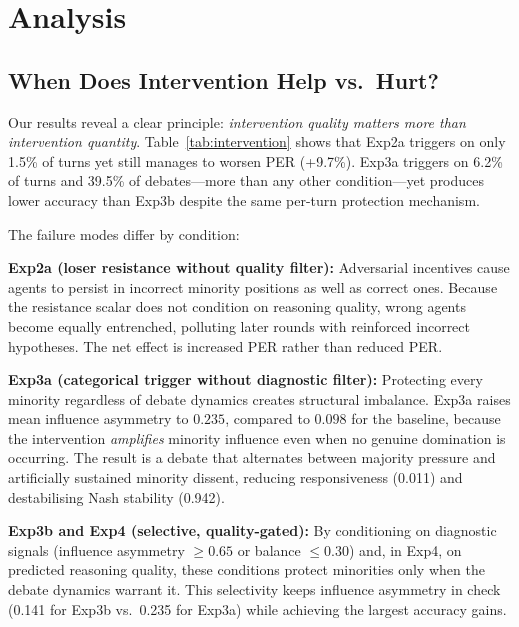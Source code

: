 \section{Analysis}
\label{sec:analysis}

\subsection{When Does Intervention Help vs.\ Hurt?}
\label{sec:when}

Our results reveal a clear principle: \emph{intervention quality matters
more than intervention quantity}.
Table~\ref{tab:intervention} shows that Exp2a triggers on only 1.5\% of
turns yet still manages to worsen PER (+9.7\%).
Exp3a triggers on 6.2\% of turns and 39.5\% of debates—more than any
other condition—yet produces lower accuracy than Exp3b despite the same
per-turn protection mechanism.

The failure modes differ by condition:

\textbf{Exp2a (loser resistance without quality filter):}
Adversarial incentives cause agents to persist in incorrect minority
positions as well as correct ones.
Because the resistance scalar does not condition on reasoning quality,
wrong agents become equally entrenched, polluting later rounds with
reinforced incorrect hypotheses.
The net effect is increased PER rather than reduced PER.

\textbf{Exp3a (categorical trigger without diagnostic filter):}
Protecting every minority regardless of debate dynamics creates structural
imbalance.
Exp3a raises mean influence asymmetry to $0.235$, compared to $0.098$ for
the baseline, because the intervention \emph{amplifies} minority influence
even when no genuine domination is occurring.
The result is a debate that alternates between majority pressure and
artificially sustained minority dissent, reducing responsiveness (0.011)
and destabilising Nash stability (0.942).

\textbf{Exp3b and Exp4 (selective, quality-gated):}
By conditioning on diagnostic signals (influence asymmetry $\geq 0.65$ or
balance $\leq 0.30$) and, in Exp4, on predicted reasoning quality, these
conditions protect minorities only when the debate dynamics warrant it.
This selectivity keeps influence asymmetry in check (0.141 for Exp3b vs.\
0.235 for Exp3a) while achieving the largest accuracy gains.

